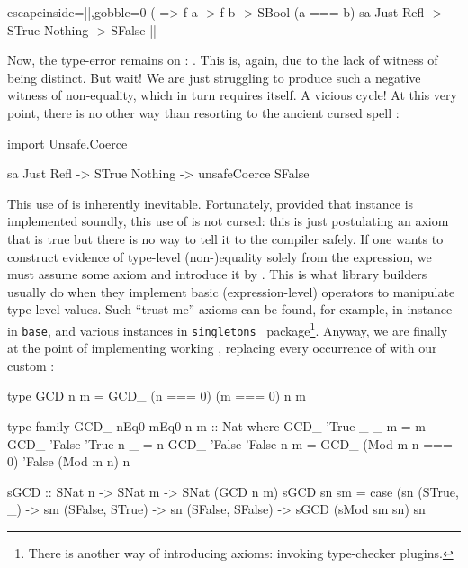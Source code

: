 \documentclass[demotion-paper.tex]{subfiles}
\begin{document}
\begin{code*}{escapeinside=||,gobble=0}
(%
       => f a -> f b -> SBool (a === b)
sa %
  Just Refl -> STrue
  Nothing -> SFalse |\label{line:falseclause}|
\end{code*}

Now, the type-error remains on : .
This is, again, due to the lack of witness of being distinct.
But wait! We are just struggling to produce such a negative witness of non-equality, which in turn requires itself. A vicious cycle!
At this very point, there is no other way than resorting to the ancient cursed spell :
\begin{code}
import Unsafe.Coerce

sa %
  Just Refl -> STrue
  Nothing -> unsafeCoerce SFalse  
\end{code}
This use of  is inherently inevitable.
Fortunately, provided that  instance is implemented soundly, this use of  is not cursed: this is just postulating an axiom that is true but there is no way to tell it to the compiler safely.
If one wants to construct evidence of type-level (non-)equality solely from the expression, we must assume some axiom and introduce it by .
This is what library builders usually do when they implement basic (expression-level) operators to manipulate type-level values.
Such ``trust me'' axioms can be found, for example, in  instance in \texttt{base}, and various  instances in \texttt{singletons}~\cite{singletons} package\footnote{There is another way of introducing axioms: invoking type-checker plugins.}.
Anyway, we are finally at the point of implementing working , replacing every occurrence of \hask{(==)} with our custom \hask{(===)}:

\begin{code}
type GCD n m = GCD_ (n === 0) (m === 0) n m

type family GCD_ nEq0 mEq0 n m :: Nat where
  GCD_ 'True  _      _ m = m
  GCD_ 'False 'True  n _ = n
  GCD_ 'False 'False n m = 
    GCD_ (Mod m n === 0) 'False (Mod m n) n

sGCD :: SNat n -> SNat m -> SNat (GCD n m)
sGCD sn sm =
  case (sn %
    (STrue, _) -> sm
    (SFalse, STrue) -> sn
    (SFalse, SFalse) -> sGCD (sMod sm sn) sn
\end{code}
\end{document}
